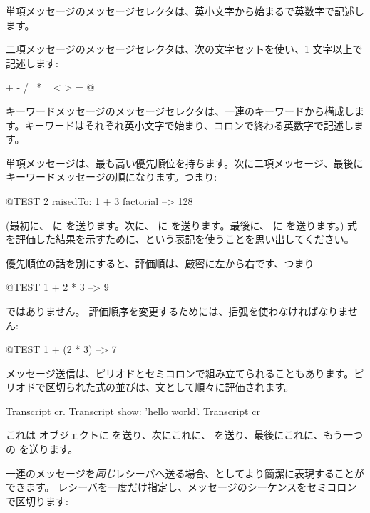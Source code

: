\documentclass[a4paper,10pt,twoside]{book}
\begin{document}
単項メッセージのメッセージセレクタは、英小文字から始まるで英数字で記述します。

二項メッセージのメッセージセレクタは、次の文字セットを使い、1 文字以上で記述します:
\begin{code}{}
+ - / \ * ~ < > = @ %
\end{code}
\noindent
キーワードメッセージのメッセージセレクタは、一連のキーワードから構成します。キーワードはそれぞれ英小文字で始まり、コロンで終わる英数字で記述します。

単項メッセージは、最も高い優先順位を持ちます。次に二項メッセージ、最後にキーワードメッセージの順になります。つまり:
\begin{code}{@TEST}
2 raisedTo: 1 + 3 factorial --> 128
\end{code}
(最初に、 に  を送ります。次に、 に  を送ります。最後に、 に  を送ります。)
式を評価した結果を示すために、\ct{-->}という表記を使うことを思い出してください。

優先順位の話を別にすると、評価順は、厳密に左から右です、つまり
\begin{code}{@TEST}
1 + 2 * 3 --> 9
\end{code}
 ではありません。
評価順序を変更するためには、括弧を使わなければなりません:
\begin{code}{@TEST}
1 + (2 * 3) --> 7
\end{code}

メッセージ送信は、ピリオドとセミコロンで組み立てられることもあります。ピリオドで区切られた式の並びは、文として順々に評価されます。

\begin{code}{}
Transcript cr.
Transcript show: 'hello world'.
Transcript cr
\end{code}

\noindent
これは  オブジェクトに  を送り、次にこれに、 を送り、最後にこれに、もう一つの  を送ります。

一連のメッセージを\emph{同じ}レシーバへ送る場合、としてより簡潔に表現することができます。
レシーバを一度だけ指定し、メッセージのシーケンスをセミコロンで区切ります:
\end{document}
